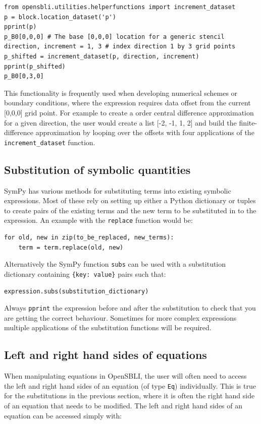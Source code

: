 \documentclass[11pt]{article}
\begin{document}
\begin{lstlisting}
from opensbli.utilities.helperfunctions import increment_dataset
p = block.location_dataset('p')
pprint(p)
p_B0[0,0,0] # The base [0,0,0] location for a generic stencil
direction, increment = 1, 3 # index direction 1 by 3 grid points
p_shifted = increment_dataset(p, direction, increment)
pprint(p_shifted)
p_B0[0,3,0]
\end{lstlisting}
This functionality is frequently used when developing numerical schemes or boundary conditions, where the expression requires data offset from the current [0,0,0] grid point. For example to create a  order central difference approximation for a given direction, the user would create a list [-2, -1, 1, 2] and build the finite-difference approximation by looping over the offsets with four applications of the \verb|increment_dataset| function.

\subsection{Substitution of symbolic quantities}
SymPy has various methods for substituting terms into existing symbolic expressions. Most of these rely on setting up either a Python dictionary or tuples to create pairs of the existing terms and the new term to be substituted in to the expression. An example with the \verb|replace| function would be:
\begin{lstlisting}
for old, new in zip(to_be_replaced, new_terms):
    term = term.replace(old, new)
\end{lstlisting}
Alternatively the SymPy function \verb|subs| can be used with a substitution dictionary containing \verb|{key: value}| pairs such that:
\begin{lstlisting}
expression.subs(substitution_dictionary)
\end{lstlisting}
Always \verb|pprint| the expression before and after the substitution to check that you are getting the correct behaviour. Sometimes for more complex expressions multiple applications of the substitution functions will be required.

\subsection{Left and right hand sides of equations}
When manipulating equations in OpenSBLI, the user will often need to access the left and right hand sides of an equation (of type \verb|Eq|) individually. This is true for the substitutions in the previous section, where it is often the right hand side of an equation that needs to be modified. The left and right hand sides of an equation can be accessed simply with:
\end{document}
